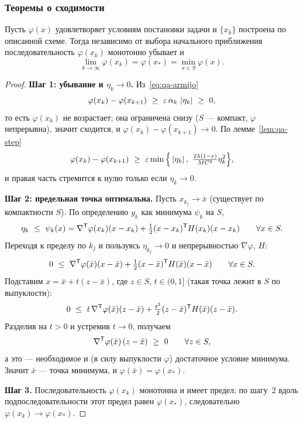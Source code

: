 \subsubsection*{Теоремы о сходимости}

\begin{theorem}\label{thm:qa-1}
Пусть $\varphi(x)$ удовлетворяет условиям постановки задачи и $\{x_k\}$
построена по описанной схеме. Тогда независимо от выбора начального
приближения последовательность $\varphi(x_k)$ монотонно убывает и
\[
  \lim_{k \to \infty} \varphi(x_k) = \varphi(x_*) = \min_{x \in S}\varphi(x) .
\]
\end{theorem}

\begin{idea}[title={Доказательство (на лекции не приводилось)}]
\begin{proof}
\textbf{Шаг 1: убывание и $\eta_k \to 0$.} Из~\eqref{eq:qa-armijo}
\[
  \varphi(x_k) - \varphi(x_{k+1}) \ \ge\ \eps\,\alpha_k\,\abs{\eta_k} \ \ge\ 0 ,
\]
то есть $\varphi(x_k)$ не возрастает; она ограничена снизу ($S$ — компакт,
$\varphi$ непрерывна), значит сходится, и $\varphi(x_k) - \varphi(x_{k+1}) \to 0$.
По лемме~\ref{lem:qa-step}
\[
  \varphi(x_k) - \varphi(x_{k+1})
  \ \ge\ \eps \min\Big\{ \abs{\eta_k},\ \tfrac{2\lambda(1-\eps)}{MC^2}\eta_k^2 \Big\} ,
\]
и правая часть стремится к нулю только если $\eta_k \to 0$.

\medskip
\textbf{Шаг 2: предельная точка оптимальна.} Пусть $x_{k_j} \to \bar{x}$
(существует по компактности $S$). По определению $y_k$ как минимума $\psi_k$
на $S$,
\[
  \eta_k \ \le\ \psi_k(x)
  = \nabla^{\mathsf{T}}\varphi(x_k)(x - x_k) + \tfrac12 (x - x_k)^{\mathsf{T}} H(x_k)(x - x_k)
  \qquad \forall x \in S .
\]
Переходя к пределу по $k_j$ и пользуясь $\eta_{k_j} \to 0$ и непрерывностью
$\nabla\varphi$, $H$:
\[
  0 \ \le\ \nabla^{\mathsf{T}}\varphi(\bar{x})(x - \bar{x})
    + \tfrac12 (x - \bar{x})^{\mathsf{T}} H(\bar{x})(x - \bar{x})
  \qquad \forall x \in S .
\]
Подставим $x = \bar{x} + t(z - \bar{x})$, где $z \in S$, $t \in (0,1]$ (такая
точка лежит в $S$ по выпуклости):
\[
  0 \ \le\ t\,\nabla\T\varphi(\bar{x})(z - \bar{x})
    + \tfrac{t^2}{2}(z - \bar{x})\T H(\bar{x})(z - \bar{x}) .
\]
Разделив на $t > 0$ и устремив $t \to 0$, получаем
\[
  \nabla^{\mathsf{T}}\varphi(\bar{x})\,(z - \bar{x}) \ \ge\ 0 \qquad \forall z \in S ,
\]
а это — необходимое и (в силу выпуклости $\varphi$) достаточное условие
минимума. Значит $\bar{x}$ — точка минимума, и
$\varphi(\bar{x}) = \varphi(x_*)$.

\medskip
\textbf{Шаг 3.} Последовательность $\varphi(x_k)$ монотонна и имеет предел;
по шагу~2 вдоль подпоследовательности этот предел равен $\varphi(x_*)$,
следовательно $\varphi(x_k) \to \varphi(x_*)$.
\end{proof}
\end{idea}

